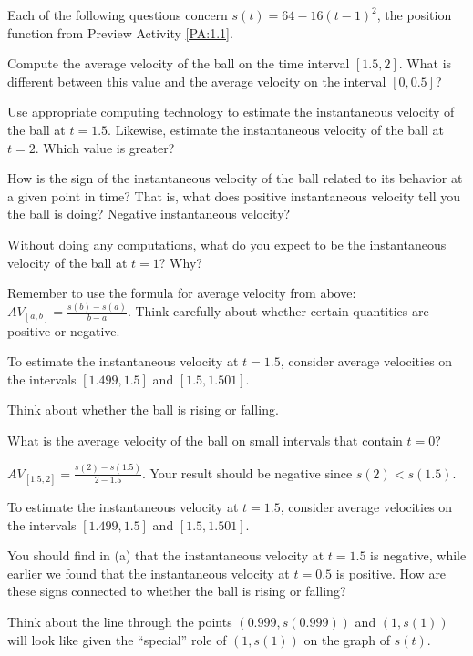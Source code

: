 \begin{activity}  \label{A:1.1.2}
Each of the following questions concern  $s(t) = 64 - 16(t-1)^2$, the position function from Preview Activity \ref{PA:1.1}.
\ba
	\item Compute the average velocity of the ball on the time interval $[1.5,2]$.  What is different between this value and the average velocity on the interval $[0,0.5]$?
	\item Use appropriate computing technology to estimate the instantaneous velocity of the ball at $t = 1.5$.  Likewise, estimate the instantaneous velocity of the ball at $t = 2$.  Which value is greater?
	\item How is the sign of the instantaneous velocity of the ball related to its behavior at a given point in time?  That is, what does positive instantaneous velocity tell you the ball is doing?  Negative instantaneous velocity?
	\item Without doing any computations, what do you expect to be the instantaneous velocity of the ball at $t = 1$?  Why?
\ea
\end{activity}
\begin{smallhint}
\ba
	\item Remember to use the formula for average velocity from above:  $AV_{[a,b]} = \frac{s(b)-s(a)}{b-a}$.  Think carefully about whether certain quantities are positive or negative.
	\item To estimate the instantaneous velocity at $t = 1.5$, consider average velocities on the intervals $[1.499,1.5]$ and $[1.5,1.501]$.
	\item Think about whether the ball is rising or falling.
	\item What is the average velocity of the ball on small intervals that contain $t = 0$?
\ea
\end{smallhint}
\begin{bighint}
\ba
	\item $AV_{[1.5,2]} = \frac{s(2)-s(1.5)}{2-1.5}$.  Your result should be negative since $s(2) < s(1.5)$.
	\item To estimate the instantaneous velocity at $t = 1.5$, consider average velocities on the intervals $[1.499,1.5]$ and $[1.5,1.501]$.
	\item You should find in (a) that the instantaneous velocity at $t = 1.5$ is negative, while earlier we found that the instantaneous velocity at $t = 0.5$ is positive.  How are these signs connected to whether the ball is rising or falling?
	\item Think about the line through the points $(0.999,s(0.999))$ and $(1,s(1))$ will look like given the ``special'' role of $(1,s(1))$ on the graph of $s(t)$.
\ea
\end{bighint}
